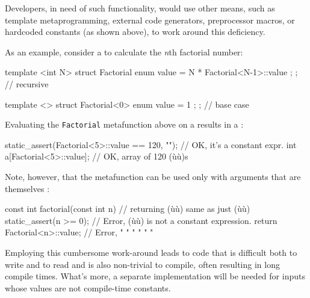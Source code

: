 \noindent Developers, in need of such functionality, would use other means, such
as template metaprogramming, external code generators, preprocessor
macros, or hardcoded constants (as shown above), to work around this
deficiency.

As an example, consider a  to calculate the
\emph{n}th factorial number:

\begin{emcppslisting}[emcppsbatch=e1]
template <int N>
struct Factorial { enum { value = N * Factorial<N-1>::value }; };  // recursive

template <>
struct Factorial<0> { enum { value = 1 }; };                       // base case
\end{emcppslisting}
    

\noindent Evaluating the \lstinline!Factorial! metafunction above on a
 results in a :

\begin{emcppslisting}[emcppsbatch=e1]
static_assert(Factorial<5>::value == 120, "");  // OK, it's a constant expr.
int a[Factorial<5>::value];                     // OK, array of 120 (ù{}ù)s
\end{emcppslisting}
    

\noindent Note, however, that the metafunction can be used only with arguments
that are themselves :

\begin{emcppslisting}
const int factorial(const int n)  // returning (ù{}ù) same as just (ù{}ù)
{
    static_assert(n >= 0);        // Error, (ù{}ù) is not a constant expression.
    return Factorial<n>::value;   // Error,  "   "  "  "     "         "
}
\end{emcppslisting}
    

\noindent Employing this cumbersome work-around leads to code that is difficult
both to write and to read and is also non-trivial to compile, often
resulting in long compile times. What's more, a separate implementation
will be needed for inputs whose values are not compile-time constants.

